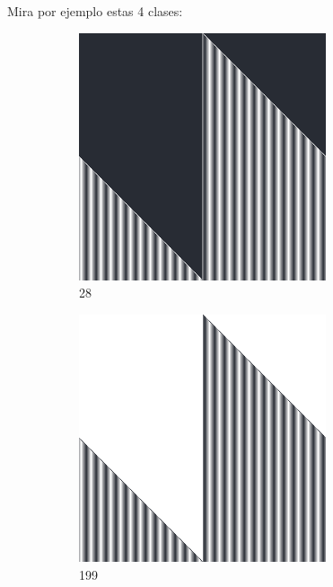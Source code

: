 \documentclass[12pt, fleqn]{report}                             %
\theoremstyle{break}                                            %
\begin{document}
      \clearpage
      Mira por ejemplo estas 4 clases:
      \begin{figure}[h!]
        \centering
        \begin{subfigure}[b]{0.4\linewidth}
          \includegraphics[width=0.8\textwidth]{Images/28/a.png}
          \caption{28}
        \end{subfigure}
        \begin{subfigure}[b]{0.4\linewidth}
          \includegraphics[width=0.8\textwidth]{Images/199/a.png}
          \caption{199}
        \end{subfigure}
        \begin{subfigure}[b]{0.4\linewidth}

\end{subfigure}
\end{figure}
\end{document}
